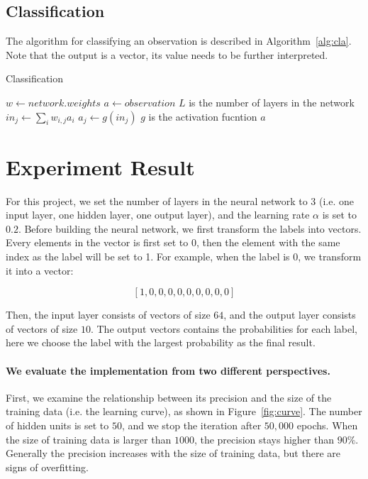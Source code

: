 \documentclass{article}
\begin{document}
\subsection{Classification}

The algorithm for classifying an observation is described in Algorithm~\ref{alg:cla}. Note that the output is a vector, its value needs to be further interpreted.

\begin{algorithm}[H]
\centering
\caption{Classification}
\label{alg:cla}
  \begin{algorithmic}[1]
    	\State $w \gets network.weights$
    	\State $a \gets observation$
    	  \Comment $L$ is the number of layers in the network
    			\State $in_j \gets \sum_i w_{i,j}a_i$
    			\State $a_j \gets g(in_j)$  \Comment $g$ is the activation fucntion
    		\EndFor
    	\EndFor
    	\State \Return $a$
    \EndFunction
  \end{algorithmic}
\end{algorithm}

\section{Experiment Result}

For this project, we set the number of layers in the neural network to $3$ (i.e. one input layer, one hidden layer, one output layer), and the learning rate $\alpha$ is set to $0.2$. Before building the neural network, we first transform the labels into vectors. Every elements in the vector is first set to 0, then the element with the same index as the label will be set to 1. For example, when the label is $0$, we transform it into a vector:

$$[1, 0, 0, 0, 0, 0, 0, 0, 0, 0]$$

Then, the input layer consists of vectors of size $64$, and the output layer consists of vectors of size $10$. The output vectors contains the probabilities for each label, here we choose the label with the largest probability as the final result.

\paragraph{We evaluate the implementation from two different perspectives.} First, we examine the relationship between its precision and the size of the training data (i.e. the learning curve), as shown in Figure~\ref{fig:curve}. The number of hidden units is set to $50$, and we stop the iteration after $50,000$ epochs. When the size of training data is larger than $1000$, the precision stays higher than $90\%$. Generally the precision increases with the size of training data, but there are signs of overfitting.
\end{document}
